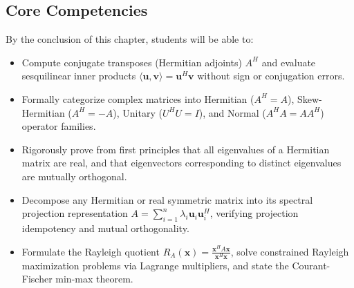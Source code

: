 \subsection{Core Competencies}
By the conclusion of this chapter, students will be able to:
\begin{itemize}
    \item Compute conjugate transposes (Hermitian adjoints) $A^H$ and evaluate sesquilinear inner products $\langle \mathbf{u}, \mathbf{v} \rangle = \mathbf{u}^H \mathbf{v}$ without sign or conjugation errors.
    \item Formally categorize complex matrices into Hermitian ($A^H = A$), Skew-Hermitian ($A^H = -A$), Unitary ($U^H U = I$), and Normal ($A^H A = A A^H$) operator families.
    \item Rigorously prove from first principles that all eigenvalues of a Hermitian matrix are real, and that eigenvectors corresponding to distinct eigenvalues are mutually orthogonal.
    \item Decompose any Hermitian or real symmetric matrix into its spectral projection representation $A = \sum_{i=1}^n \lambda_i \mathbf{u}_i \mathbf{u}_i^H$, verifying projection idempotency and mutual orthogonality.
    \item Formulate the Rayleigh quotient $R_A(\mathbf{x}) = \frac{\mathbf{x}^H A \mathbf{x}}{\mathbf{x}^H \mathbf{x}}$, solve constrained Rayleigh maximization problems via Lagrange multipliers, and state the Courant-Fischer min-max theorem.
\end{itemize}

